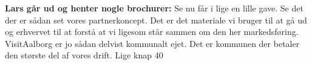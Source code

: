 \textbf{Lars går ud og henter nogle brochurer:} Se nu får i lige en lille gave. Se det der er sådan set vores partnerkoncept. Det er det materiale vi bruger til at gå ud og erhvervet til at forstå at vi ligesom står sammen om den her markedsføring. VisitAalborg er jo sådan delvist kommunalt ejet. Det er kommunen der betaler den største del af vores drift. Lige knap 40%
